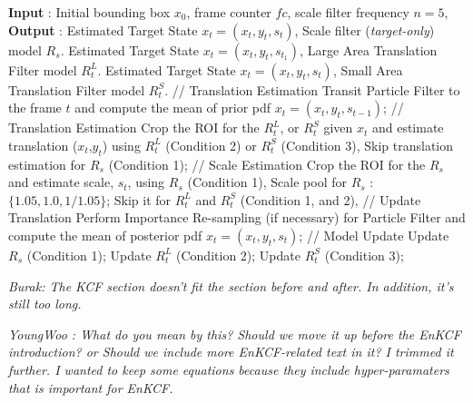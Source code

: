\documentclass{bmvc2k}
\begin{document}
\begin{algorithm}
	\caption{The {\it E}nKCF Tracking Algorithm.}\label{alg:MKCF}
	\begin{algorithmic}[1]
	\State \textbf{Input} : Initial bounding box $x_{0}$, frame counter $fc$, scale filter frequency $n = 5$,
	\State \textbf{Output} : 
				 
						\State Estimated Target State $x_{t} = (x_{t},y_{t},s_{t})$,
						Scale filter (\textit{target-only}) model $R_{s}$.
			     \EndIf
						\State Estimated Target State $x_{t} = (x_{t},y_{t},s_{t_1})$,
						Large Area Translation Filter model $R_{t}^{L}$.
				\EndIf
						\State Estimated Target State $x_{t} = (x_{t},y_{t},s_{t})$,
						Small Area Translation Filter model $R_{t}^{S}$.
				\EndIf
				\State // Translation Estimation
				\State Transit Particle Filter to the frame $t$ and compute the mean of prior pdf $x_{t} = (x_{t},y_{t},s_{t-1})$;
				\State // Translation Estimation
				\State Crop the ROI for the $R_{t}^{L}$, or $R_{t}^{S}$ given $x_{t}$
				and estimate translation ($x_{t}$,$y_{t}$) using $R_{t}^{L}$ (Condition 2) or $R_{t}^{S}$ (Condition 3),
				\State Skip translation estimation for $R_{s}$ (Condition 1);
				\State // Scale Estimation
			    \State Crop the ROI for the $R_{s}$ and estimate scale, $s_{t}$, using $R_{s}$ (Condition 1), 
				\State Scale pool for $R_{s}$ : $\lbrace1.05,1.0,1/1.05\rbrace$;
		        \State Skip it for $R_{t}^{L}$ and $R_{t}^{S}$ (Condition 1, and 2),
				\State // Update Translation
				\State Perform Importance Re-sampling (if necessary) for Particle Filter and compute the mean of posterior pdf $x_{t} = (x_{t},y_{t},s_{t})$;
			    \State // Model Update
				\State Update $R_{s}$ (Condition 1);
				\EndIf							 
				\State Update $R_{t}^{L}$ (Condition 2);
				\EndIf	
				\State Update $R_{t}^{S}$ (Condition 3);
			     \EndIf		
	\EndProcedure	
	\end{algorithmic}
\end{algorithm}

{\it Burak: The KCF section doesn't fit the section before and
  after. In addition, it's still too long.}
  
{\it YoungWoo : What do you mean by this? Should we move it up before the EnKCF introduction? or Should we include more EnKCF-related text in it? I trimmed it further. I wanted to keep some equations because they include hyper-paramaters that is important for EnKCF.}
\end{document}
